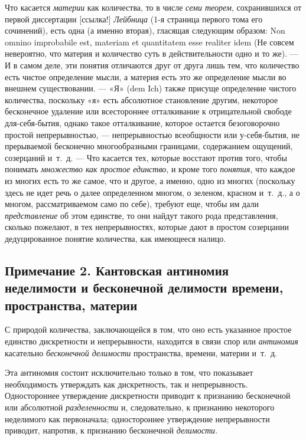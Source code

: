 Что касается {\em материи} как количества, то в числе
{\em семи теорем}, сохранившихся от первой
диссертации [ссылка!] {\em Лейбница} (1-я страница первого тома его
сочинений), есть одна (а именно вторая), гласящая следующим образом: Non
omnino improbabile est, materiam et quantitatem esse realiter idem
(Не совсем невероятно, что материя и количество суть в действительности
одно и то же). — И в самом деле, эти понятия отличаются друг от друга лишь
тем, что количество есть чистое определение мысли, а материя есть это же
определение мысли во внешнем существовании. — «Я» (dem Ich) также присуще
определение чистого количества, поскольку «я» есть абсолютное становление
другим, некоторое бесконечное удаление или всестороннее отталкивание к
отрицательной свободе для-себя-бытия, однако такое отталкивание, которое
остается безоговорочно простой непрерывностью, — непрерывностью всеобщности
или у-себя-бытия, не прерываемой бесконечно многообразными границами,
содержанием ощущений, созерцаний и~т.~д. — Что касается тех, которые
восстают против того, чтобы понимать {\em множество как
простое единство}, и кроме того {\em понятия}, что
каждое из многих есть то же самое, что и другое, а именно, одно из многих
(поскольку здесь не идет речь о далее определенном многом, о зеленом,
красном и~т.~д., а о многом, рассматриваемом само по себе), требуют еще,
чтобы им дали {\em представление} об этом единстве, то
они найдут такого рода представления, сколько пожелают, в тех
непрерывностях, которые дают в простом созерцании дедуцированное понятие
количества, как имеющееся налицо.

\subsection*{Примечание 2. Кантовская антиномия неделимости и бесконечной
делимости времени, пространства, материи}

С природой количества, заключающейся в том, что оно есть указанное простое
единство дискретности и непрерывности, находится в связи спор или
{\em антиномия} касательно
{\em бесконечной делимости} пространства, времени,
материи и~т.~д.

Эта антиномия состоит исключительно только в том, что показывает
необходимость утверждать как дискретность, так и непрерывность.
Одностороннее утверждение дискретности приводит к признанию бесконечной или
абсолютной {\em разделенности} и, следовательно, к
признанию некоторого неделимого как первоначала; одностороннее утверждение
непрерывности приводит, напротив, к признанию бесконечной
{\em делимости}.

